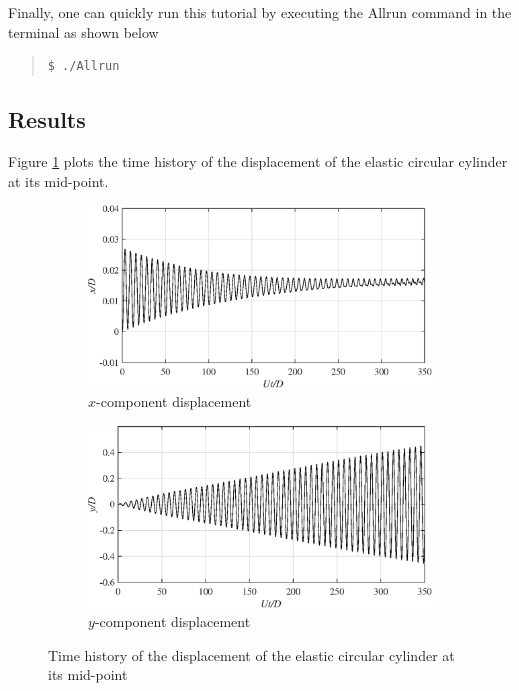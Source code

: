 Finally, one can quickly run this tutorial by executing the Allrun command in the terminal as shown below

\begin{quote}
\begin{verbatim}
$ ./Allrun
\end{verbatim}
\end{quote}

\subsection{Results}

Figure \ref{results2} plots the time history of the displacement of the elastic circular cylinder at its mid-point.

\begin{figure}[H]
\centering
    \begin{subfigure}[b]{0.6\linewidth}
        \includegraphics[width=\linewidth]{images/xdisp2.eps}
        \caption{$x$-component displacement}
     \end{subfigure}
    \begin{subfigure}[b]{0.6\linewidth}
        \includegraphics[width=\linewidth]{images/ydisp2.eps}
        \caption{$y$-component displacement}
    \end{subfigure}
      \caption{Time history of the displacement of the elastic circular cylinder at its mid-point}\label{results2}
\end{figure}
